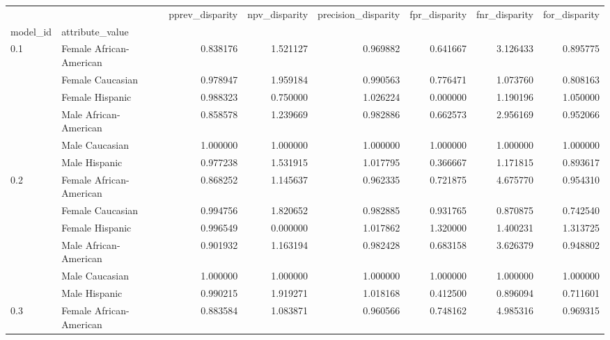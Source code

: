 \begin{tabular}{llrrrrrr}
\toprule
    &               &  pprev\_disparity &  npv\_disparity &  precision\_disparity &  fpr\_disparity &  fnr\_disparity &  for\_disparity \\
model\_id & attribute\_value &                  &                &                      &                &                &                \\
\midrule
0.1 & Female African-American &         0.838176 &       1.521127 &             0.969882 &       0.641667 &       3.126433 &       0.895775 \\
    & Female Caucasian &         0.978947 &       1.959184 &             0.990563 &       0.776471 &       1.073760 &       0.808163 \\
    & Female Hispanic &         0.988323 &       0.750000 &             1.026224 &       0.000000 &       1.190196 &       1.050000 \\
    & Male African-American &         0.858578 &       1.239669 &             0.982886 &       0.662573 &       2.956169 &       0.952066 \\
    & Male Caucasian &         1.000000 &       1.000000 &             1.000000 &       1.000000 &       1.000000 &       1.000000 \\
    & Male Hispanic &         0.977238 &       1.531915 &             1.017795 &       0.366667 &       1.171815 &       0.893617 \\
0.2 & Female African-American &         0.868252 &       1.145637 &             0.962335 &       0.721875 &       4.675770 &       0.954310 \\
    & Female Caucasian &         0.994756 &       1.820652 &             0.982885 &       0.931765 &       0.870875 &       0.742540 \\
    & Female Hispanic &         0.996549 &       0.000000 &             1.017862 &       1.320000 &       1.400231 &       1.313725 \\
    & Male African-American &         0.901932 &       1.163194 &             0.982428 &       0.683158 &       3.626379 &       0.948802 \\
    & Male Caucasian &         1.000000 &       1.000000 &             1.000000 &       1.000000 &       1.000000 &       1.000000 \\
    & Male Hispanic &         0.990215 &       1.919271 &             1.018168 &       0.412500 &       0.896094 &       0.711601 \\
0.3 & Female African-American &         0.883584 &       1.083871 &             0.960566 &       0.748162 &       4.985316 &       0.969315 \\

\end{tabular}
